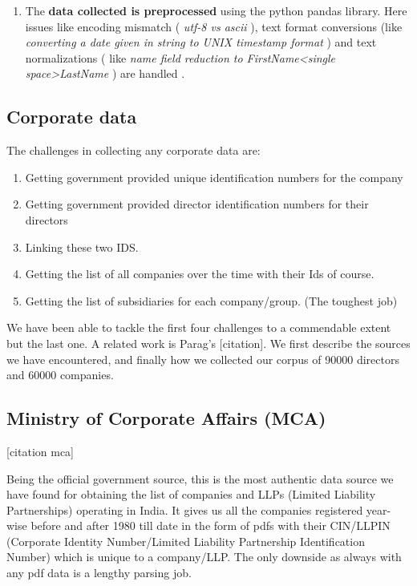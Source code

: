 \begin{enumerate}
    \item The \textbf{ data collected is preprocessed } using the python pandas library. Here issues like encoding mismatch (\emph{ utf-8 vs ascii }), text format conversions (like \emph{ converting a date given in string to UNIX timestamp format }) and text normalizations ( like \emph{ name field reduction to FirstName<single space>LastName }) are handled .

\end{enumerate}


\subsection{Corporate data}

The challenges in collecting any corporate data are:

\begin{enumerate}
    \item Getting government provided unique identification numbers for the company
    \item Getting government provided director identification numbers for their directors
    \item Linking these two IDS.
    \item Getting the list of all companies over the time with their Ids of course.
    \item Getting the list of subsidiaries for each company/group. (The toughest job)
\end{enumerate}  

We have been able to tackle the first four challenges to a commendable extent but the last one. A related work is Parag's [citation]. We first describe the sources we have encountered, and finally how we collected our corpus of 90000 directors and 60000 companies.

\subsection{Ministry of Corporate Affairs (MCA)}
[citation mca]

Being the official government source, this is the most authentic data source we have found for obtaining the list of companies and LLPs (Limited Liability Partnerships) operating in India. It gives us all the companies registered year-wise before and after 1980 till date in the form of pdfs with their CIN/LLPIN (Corporate Identity Number/Limited Liability Partnership Identification Number) which is unique to a company/LLP. The only downside as always with any pdf data is a lengthy parsing job.

